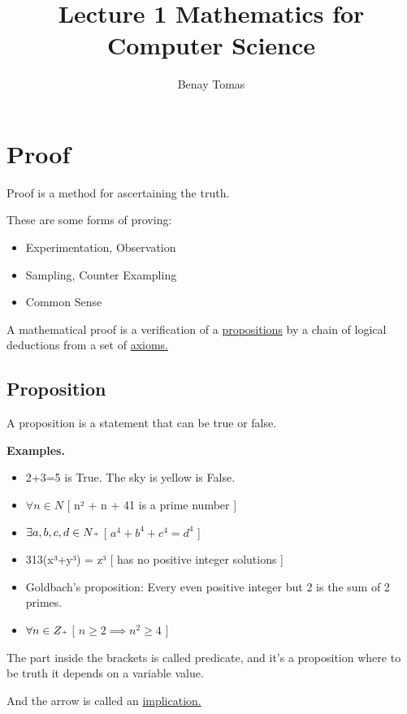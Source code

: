\documentclass{article}
\title{Lecture 1 Mathematics for Computer Science}
\author{Benay Tomas}
\newcommand{\plus}{\scalebox{0.6}{$+$}}
\begin{document}
\selectfont

\maketitle


\section{Proof}
Proof is a method for ascertaining the truth.

These are some forms of proving:

\begin{itemize}
    \item Experimentation, Observation
    \item Sampling, Counter Exampling
    \item Common Sense
\end{itemize}

A mathematical proof is a verification of a \underline{propositions}
by a chain of logical deductions from a set of \underline{axioms.}

\subsection{Proposition}

A proposition is a statement
that can be true or false.

\textbf{Examples.}

\begin{itemize}
    \item[] 2+3=5 is True. The sky is
    yellow is False.
    \item[] $\forall n \in N$ [ n² + n + 41 is a prime number ]
    \item[] $\exists a, b, c, d \in N\plus$ [ $a^{4} + b^{4} + c^{4} = d^{4}$ ]
    \item[] 313(x³+y³) = z³ [ has no positive integer solutions ]
    \item[] Goldbach's proposition: Every even positive integer but 2 is the sum of 2 primes.
    \item[] $\forall n \in Z\plus$ [ $n \ge 2 \implies n^{2} \ge 4$ ]
\end{itemize}

The part inside the brackets is called
predicate, and it's a proposition where 
to be truth it depends on a variable value.

And the arrow is called an \underline{implication.}
\end{document}
